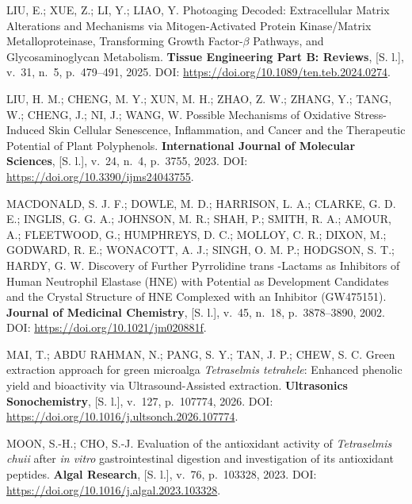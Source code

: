 \begin{samepage}
\filbreak\hypertarget{cite.0@liu2025}{}LIU, E.; XUE, Z.; LI, Y.; LIAO, Y. Photoaging Decoded: Extracellular Matrix Alterations and Mechanisms via Mitogen-Activated Protein Kinase/Matrix Metalloproteinase, Transforming Growth Factor-$\beta$ Pathways, and Glycosaminoglycan Metabolism. \textbf{Tissue Engineering Part B: Reviews}, [S. l.], v.~31, n.~5, p.~479--491, 2025. DOI: \url{https://doi.org/10.1089/ten.teb.2024.0274}.
\end{samepage}

\begin{samepage}
\filbreak\hypertarget{cite.0@liu2023}{}LIU, H. M.; CHENG, M. Y.; XUN, M. H.; ZHAO, Z. W.; ZHANG, Y.; TANG, W.; CHENG, J.; NI, J.; WANG, W. Possible Mechanisms of Oxidative Stress-Induced Skin Cellular Senescence, Inflammation, and Cancer and the Therapeutic Potential of Plant Polyphenols. \textbf{International Journal of Molecular Sciences}, [S. l.], v.~24, n.~4, p.~3755, 2023. DOI: \url{https://doi.org/10.3390/ijms24043755}.
\end{samepage}

\begin{samepage}
\filbreak\hypertarget{cite.0@macdonald2002}{}MACDONALD, S. J. F.; DOWLE, M. D.; HARRISON, L. A.; CLARKE, G. D. E.; INGLIS, G. G. A.; JOHNSON, M. R.; SHAH, P.; SMITH, R. A.; AMOUR, A.; FLEETWOOD, G.; HUMPHREYS, D. C.; MOLLOY, C. R.; DIXON, M.; GODWARD, R. E.; WONACOTT, A. J.; SINGH, O. M. P.; HODGSON, S. T.; HARDY, G. W. Discovery of Further Pyrrolidine trans -Lactams as Inhibitors of Human Neutrophil Elastase (HNE) with Potential as Development Candidates and the Crystal Structure of HNE Complexed with an Inhibitor (GW475151). \textbf{Journal of Medicinal Chemistry}, [S. l.], v.~45, n.~18, p.~3878--3890, 2002. DOI: \url{https://doi.org/10.1021/jm020881f}.
\end{samepage}

\begin{samepage}
\filbreak\hypertarget{cite.0@mai2026}{}MAI, T.; ABDU RAHMAN, N.; PANG, S. Y.; TAN, J. P.; CHEW, S. C. Green extraction approach for green microalga \textit{Tetraselmis tetrahele}: Enhanced phenolic yield and bioactivity via Ultrasound-Assisted extraction. \textbf{Ultrasonics Sonochemistry}, [S. l.], v.~127, p.~107774, 2026. DOI: \url{https://doi.org/10.1016/j.ultsonch.2026.107774}.
\end{samepage}

\begin{samepage}
\filbreak\hypertarget{cite.0@moon2023}{}MOON, S.-H.; CHO, S.-J. Evaluation of the antioxidant activity of \textit{Tetraselmis chuii} after \textit{in vitro} gastrointestinal digestion and investigation of its antioxidant peptides. \textbf{Algal Research}, [S. l.], v.~76, p.~103328, 2023. DOI: \url{https://doi.org/10.1016/j.algal.2023.103328}.
\end{samepage}

